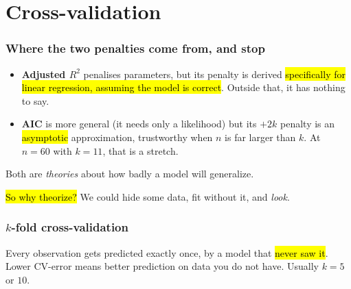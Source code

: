 \documentclass[slidestop,compress,mathserif]{beamer}
\begin{document}
\section{Cross-validation}
\begin{frame}
\frametitle{Where the two penalties come from, and stop}

\begin{itemize}
\item \textbf{Adjusted $R^2$} penalises parameters, but its penalty is derived \hl{specifically for linear regression, assuming the model is correct}. Outside that, it has nothing to say.
\pause
\item \textbf{AIC} is more general (it needs only a likelihood) but its $+2k$ penalty is an \hl{asymptotic} approximation, trustworthy when $n$ is far larger than $k$. At $n = 60$ with $k = 11$, that is a stretch.
\end{itemize}

\pause
\vspace{0.5em}
Both are \emph{theories} about how badly a model will generalize.

\pause
\vspace{0.3em}
\hl{So why theorize?} We could hide some data, fit without it, and \emph{look}.

\end{frame}


\begin{frame}
\frametitle{$k$-fold cross-validation}


\pause
\vspace{0.3em}
{\small Every observation gets predicted exactly once, by a model that \hl{never saw it}. Lower CV-error means better prediction on data you do not have. Usually $k = 5$ or $10$.}

\end{frame}
\end{document}

